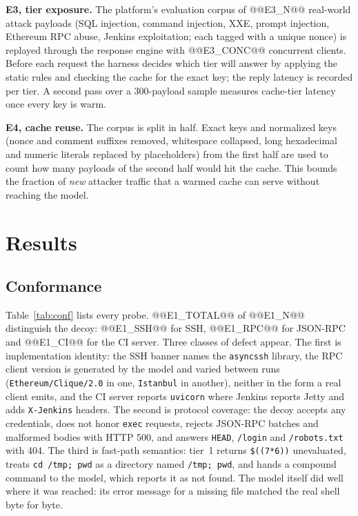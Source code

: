 \documentclass[conference]{IEEEtran}
\begin{document}
\textbf{E3, tier exposure.} The platform's evaluation corpus of @@E3_N@@ real-world attack payloads (SQL injection, command injection, XXE, prompt injection, Ethereum RPC abuse, Jenkins exploitation; each tagged with a unique nonce) is replayed through the response engine with @@E3_CONC@@ concurrent clients. Before each request the harness decides which tier will answer by applying the static rules and checking the cache for the exact key; the reply latency is recorded per tier. A second pass over a 300-payload sample measures cache-tier latency once every key is warm.

\textbf{E4, cache reuse.} The corpus is split in half. Exact keys and normalized keys (nonce and comment suffixes removed, whitespace collapsed, long hexadecimal and numeric literals replaced by placeholders) from the first half are used to count how many payloads of the second half would hit the cache. This bounds the fraction of \emph{new} attacker traffic that a warmed cache can serve without reaching the model.

\section{Results}
\label{sec:results}

\subsection{Conformance}
\label{sec:res-conf}
Table~\ref{tab:conf} lists every probe. @@E1_TOTAL@@ of @@E1_N@@ distinguish the decoy: @@E1_SSH@@ for SSH, @@E1_RPC@@ for JSON-RPC and @@E1_CI@@ for the CI server. Three classes of defect appear. The first is implementation identity: the SSH banner names the \texttt{asyncssh} library, the RPC client version is generated by the model and varied between runs (\texttt{Ethereum/Clique/2.0} in one, \texttt{Istanbul} in another), neither in the form a real client emits, and the CI server reports \texttt{uvicorn} where Jenkins reports Jetty and adds \texttt{X-Jenkins} headers. The second is protocol coverage: the decoy accepts any credentials, does not honor \texttt{exec} requests, rejects JSON-RPC batches and malformed bodies with HTTP 500, and answers \texttt{HEAD}, \texttt{/login} and \texttt{/robots.txt} with 404. The third is fast-path semantics: tier~1 returns \texttt{\$((7*6))} unevaluated, treats \texttt{cd /tmp; pwd} as a directory named \texttt{/tmp; pwd}, and hands a compound command to the model, which reports it as not found. The model itself did well where it was reached: its error message for a missing file matched the real shell byte for byte.
\end{document}
